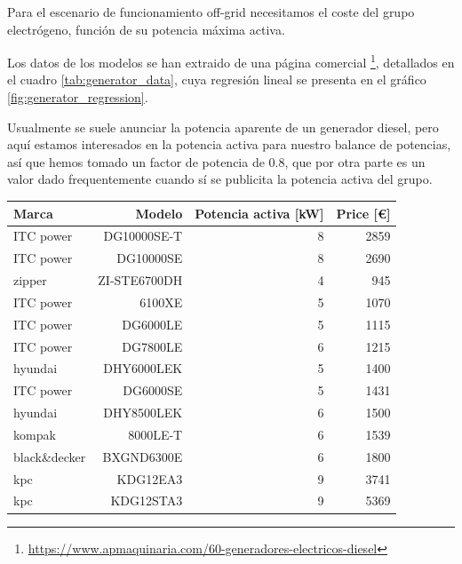 Para el escenario de funcionamiento off-grid necesitamos el coste del grupo
electrógeno, función de su potencia máxima activa.

Los datos de los modelos se han extraido de una página comercial
\footnote{\url{https://www.apmaquinaria.com/60-generadores-electricos-diesel}},
detallados en el cuadro \ref{tab:generator_data}, cuya regresión lineal se
presenta en el gráfico \ref{fig:generator_regression}.

Usualmente se suele anunciar la potencia aparente de un generador diesel, pero
aquí estamos interesados en la potencia activa para nuestro balance de
potencias, así que hemos tomado un factor de potencia de 0.8, que por otra
parte es un valor dado frequentemente cuando sí se publicita la potencia activa
del grupo.

\begin{table}[htbp]
	\centering
	\begin{tabular}{lrrr}
		\toprule
		Marca         & Modelo         & Potencia activa [kW] & Price [\euro] \\
		\midrule
		ITC power     & DG10000SE-T    & 8                    & 2859          \\
		ITC power     & DG10000SE      & 8                    & 2690          \\
		zipper        & ZI-STE6700DH   & 4                    & 945           \\
		ITC power     & 6100XE         & 5                    & 1070          \\
		ITC power     & DG6000LE       & 5                    & 1115          \\
		ITC power     & DG7800LE       & 6                    & 1215          \\
		hyundai       & DHY6000LEK     & 5                    & 1400          \\
		ITC power     & DG6000SE       & 5                    & 1431          \\
		hyundai       & DHY8500LEK     & 6                    & 1500          \\
		kompak        & 8000LE-T       & 6                    & 1539          \\
		black\&decker & BXGND6300E     & 6                    & 1800          \\
		kpc           & KDG12EA3       & 9                    & 3741          \\
		kpc           & KDG12STA3      & 9                    & 5369          \\

\end{tabular}
\end{table}
